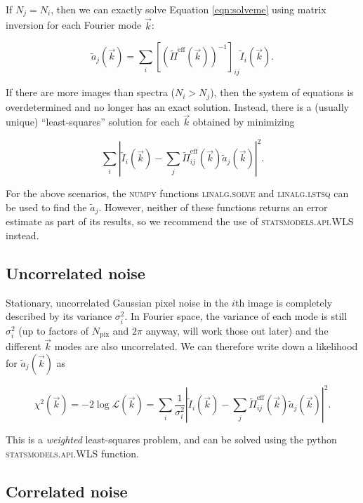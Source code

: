 \documentclass{article}
\begin{document}
If $N_j = N_i$, then we can exactly solve Equation \ref{eqn:solveme} using matrix inversion for each
Fourier mode $\vec{k}$:

\begin{equation}
  \tilde{a}_j(\vec{k}) = \sum_i [(\tilde{\Pi}^\mathrm{eff}(\vec{k}))^{-1}]_{ij} \tilde{I}_i(\vec{k}).
\end{equation}

If there are more images than spectra ($N_i > N_j$), then the system of equations is overdetermined
and no longer has an exact solution.  Instead, there is a (usually unique) ``least-squares''
solution for each $\vec{k}$ obtained by minimizing

\begin{equation}
  \label{eqn:lstsq}
  \sum_i\left|\tilde{I}_i(\vec{k}) - \sum_j \tilde{\Pi}^\mathrm{eff}_{ij}(\vec{k}) \tilde{a}_j(\vec{k})\right|^2.
\end{equation}

For the above scenarios, the \textsc{numpy} functions \textsc{linalg.solve} and
\textsc{linalg.lstsq} can be used to find the $\tilde{a}_j$.  However, neither of these functions
returns an error estimate as part of its results, so we recommend the use of
\textsc{statsmodels.api.WLS} instead.

\subsection{Uncorrelated noise}

Stationary, uncorrelated Gaussian pixel noise in the $i$th image is completely described by its
variance $\sigma^2_i$.  In Fourier space, the variance of each mode is still $\sigma^2_i$ (up to
factors of $N_\mathrm{pix}$ and $2 \pi$ anyway, will work those out later) and the different
$\vec{k}$ modes are also uncorrelated.  We can therefore write down a likelihood for
$\tilde{a}_j(\vec{k})$ as

\begin{equation}
    \label{eqn:like}
    \chi^2(\vec{k}) = -2 \log \mathcal{L}(\vec{k}) = \sum_i\frac{1}{\sigma_i^2}\left|\tilde{I}_i(\vec{k}) - \sum_j \tilde{\Pi}^\mathrm{eff}_{ij}(\vec{k}) \tilde{a}_j(\vec{k})\right|^2.
\end{equation}

This is a \textit{weighted} least-squares problem, and can be solved using the python
\textsc{statsmodels.api.WLS} function.

\subsection{Correlated noise}
\end{document}
